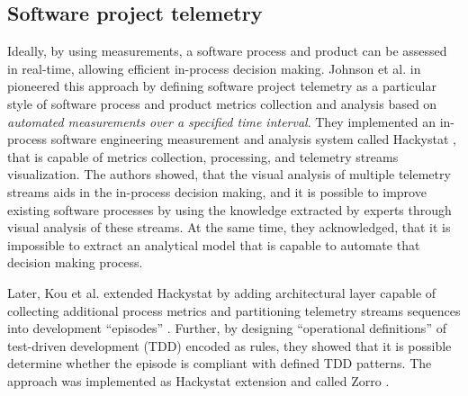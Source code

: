 \subsection{Software project telemetry}\label{section_software_telemetry}
Ideally, by using measurements, a software process and product can be assessed in real-time, allowing efficient 
in-process decision making.
Johnson et al. in \cite{citeulike:557296} pioneered this approach by defining software project telemetry as a 
particular style of software process and product metrics collection and analysis based on 
\textit{automated measurements over a specified time interval}. 
They implemented an in-process software engineering measurement and analysis system called Hackystat 
\cite{citeulike:12929227}, that is capable of metrics collection, processing, and telemetry streams visualization. 
The authors showed, that the visual analysis of multiple telemetry streams aids in the in-process decision making, 
and it is possible to improve existing software processes by using the knowledge extracted by experts through visual 
analysis of these streams. 
At the same time, they acknowledged, that it is impossible to extract an analytical model that is capable to 
automate that decision making process.

Later, Kou et al. extended Hackystat by adding architectural layer capable of collecting additional process metrics 
and partitioning telemetry streams sequences into development ``episodes'' \cite{citeulike:6180831}. 
Further, by designing ``operational definitions'' of test-driven development (TDD) encoded as rules,
they showed that it is possible determine whether the episode is compliant with
defined TDD patterns.
The approach was implemented as Hackystat extension and called Zorro \cite{citeulike:11538873}.

